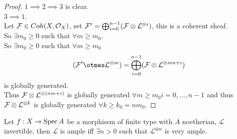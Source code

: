 \documentclass[../main.tex]{subfiles}
\begin{document}
\begin{proof}
$1\implies 2 \implies 3$ is clear.\\
$3\implies 1$.\\
Let $\mathcal{F}\in Coh( X, \mathcal{O}_X) $, set $\mathcal{F}' = \bigoplus_{i=0}^{n-1} ( \mathcal{F} \otimes \mathcal{L}^{\otimes i}) $, this is a coherent sheaf.\\
So $\exists m_0 \geq 0$ such that $ \forall m \geq m_0$.\\
So $\exists m_0 \geq 0$ such that $\forall m \geq m_0$ 
\[ 
	( \F' \otmes \mathcal{L}^{\otimes m}) = \bigoplus_{i=0}^{n-1}( \F \otimes \mathcal{L}^{\otimes mn+i}) 
\]
is globally generated.\\
Thus $\mathcal{F} \otimes \mathcal{L}^{ \otimes ( nm+i) }$ is globally generated $\forall m \geq m_0 i=0,\ldots,n-1$ and thus $\mathcal{F} \otimes \mathcal{L}^{\otimes k}$ is globally generated $\forall k \geq k_0 = nm_0$.
\end{proof}
\begin{thm}
	Let $f:X\to \operatorname{Spec} A$ be a morphissm of finite type with $A$ noetherian, $ \mathcal{L}$ invertible, then $\mathcal{L}$ is ample iff $\exists n>0$ such that $ \mathcal{L}^{\otimes n}$ is very ample.
\end{thm}
\end{document}
